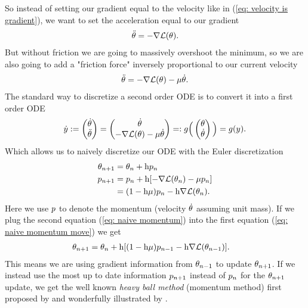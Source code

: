 So instead of setting our gradient equal to the velocity like in (\ref{eq:
velocity is gradient}), we want to set the acceleration equal to our gradient
%
\begin{align*}
	\ddot{\theta} = -\nabla \mathcal{L}(\theta).
\end{align*}
%
But without friction we are going to massively overshoot the minimum, so we are
also going to add a "friction force" inversely proportional to our current
velocity
%
\begin{align}\label{eq: acceleration is gradient + friction}
	\ddot{\theta} = -\nabla \mathcal{L}(\theta) - \mu \dot{\theta}.
\end{align}
%
The standard way to discretize a second order ODE is to convert it into a first
order ODE
%
\begin{align*}
	\dot{y} := \begin{pmatrix}
		\dot{\theta}\\
		\ddot{\theta}
	\end{pmatrix}
	= \begin{pmatrix}
		\dot{\theta} \\
		-\nabla \mathcal{L}(\theta) - \mu \dot{\theta}
	\end{pmatrix}
	=: g\Big(\begin{pmatrix}
		\theta \\
		\dot{\theta}
	\end{pmatrix}\Big)
	= g(y).
\end{align*}
%
Which allows us to naively discretize our ODE with the Euler discretization
%
\begin{subequations}
\begin{align}
	\theta_{n+1} &= \theta_n + \text{h} p_n \label{eq: naive momentum move}\\
	p_{n+1} &= p_n + \text{h} [-\nabla \mathcal{L}(\theta_n) - \mu p_n]
	\label{eq: naive momentum}\\ \nonumber
	&= (1-\text{h}\mu)p_n - \text{h}\nabla \mathcal{L}(\theta_n).
\end{align}
\end{subequations}
%
Here we use \(p\) to denote the momentum (velocity \(\dot{\theta}\)
assuming unit mass).
If we plug the second equation (\ref{eq: naive momentum}) into the first
equation (\ref{eq: naive momentum move}) we get
%
\begin{align*}
	\theta_{n+1}
	&= \theta_n + \text{h} [(1-\text{h}\mu)p_{n-1} - \text{h}\nabla \mathcal{L}(\theta_{n-1})].
\end{align*}
%
This means we are using gradient information from \(\theta_{n-1}\) to update
\(\theta_{n+1}\). If we instead use the most up to date information
\(p_{n+1}\) instead of \(p_n\) for the \(\theta_{n+1}\) update,
we get the well known \emph{heavy ball method} (momentum method) first proposed
by \textcite{polyakMethodsSpeedingConvergence1964} and wonderfully illustrated
by \textcite{gohWhyMomentumReally2017}.

